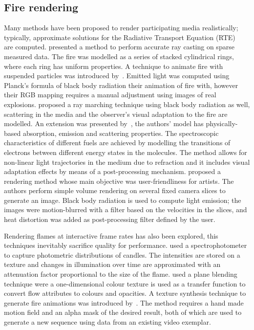 \documentclass{acmsiggraph}
\begin{document}
\subsection{Fire rendering}

Many methods have been proposed to render participating media realistically; typically, approximate solutions for the Radiative Transport Equation (RTE)~\cite{Howell:2002} are computed.
\cite{Rushmeier:1995} presented a method to perform accurate ray casting on sparse measured data.
The fire was modelled as a series of stacked cylindrical rings, where each ring has uniform properties.
A technique to animate fire with suspended particles was introduced by~\cite{Feldman:2003}.
Emitted light was computed using Planck's formula of black body radiation their animation of fire with, however their RGB mapping requires a manual adjustment using images of real explosions.
\cite{Nguyen:2002} proposed a ray marching technique using black body radiation as well, scattering in the media and the observer's visual adaptation to the fire are modelled.
An extension was presented by~\cite{Pegoraro:2006}, the authors' model has physically-based absorption, emission and scattering properties.
The spectroscopic characteristics of different fuels are achieved by modelling the transitions of electrons between different energy states in the molecules.
The method allows for non-linear light trajectories  in the medium due to refraction and it includes visual adaptation effects by means of a post-processing mechanism.
\cite{Horvath:2009} proposed a rendering method whose main objective was user-friendliness for artists.
The authors perform simple volume rendering on several fixed camera slices to generate an image.
Black body radiation is used to compute light emission; the images were motion-blurred with a filter based on the velocities in the slices, and heat distortion was added as post-processing filter defined by the user.

Rendering flames at interactive frame rates has also been explored, this techniques inevitably sacrifice quality for performance.
\cite{Bridault:2006} used a spectrophotometer to capture photometric distributions of candles.
The intensities are stored on a texture and changes in illumination over time are approximated with an attenuation factor proportional to the size of the flame.
\cite{Zhang:2011} used a plane blending technique were a one-dimensional colour texture is used as a transfer function to convert flow attributes to colours and opacities. 
A texture synthesis technique to generate fire animations was introduced by~\cite{Jamriska:2015}.
The method requires a hand made motion field and an alpha mask of the desired result, both of which are used to generate a new sequence using data from an existing video exemplar.
\end{document}
